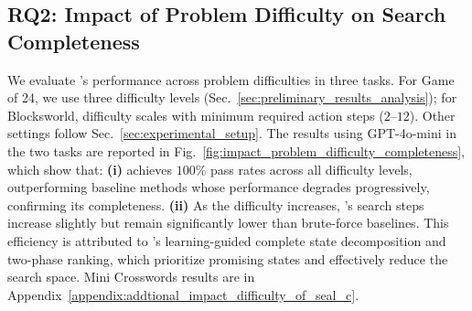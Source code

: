 \subsection{RQ2: Impact of Problem Difficulty on Search Completeness}
\label{sec:rq2}
We evaluate \cmethod's performance across problem difficulties in three tasks. For Game of 24, we use three difficulty levels (Sec.~\ref{sec:preliminary_results_analysis}); for Blocksworld, difficulty scales with minimum required action steps ($2$–$12$). Other settings follow Sec.~\ref{sec:experimental_setup}. The results using GPT-4o-mini in the two tasks are reported in Fig.~\ref{fig:impact_problem_difficulty_completeness}, which show that: \textbf{(i)} \cmethod achieves $100\%$ pass rates across all difficulty levels, outperforming baseline methods whose performance degrades progressively, confirming its completeness. \textbf{(ii)} As the difficulty increases, \cmethod's search steps increase slightly but remain significantly lower than brute-force baselines. This efficiency is attributed to \cmethod's learning-guided complete state decomposition and two-phase ranking, which prioritize promising states and effectively reduce the search space. Mini Crosswords results are in Appendix~\ref{appendix:addtional_impact_difficulty_of_seal_c}.

